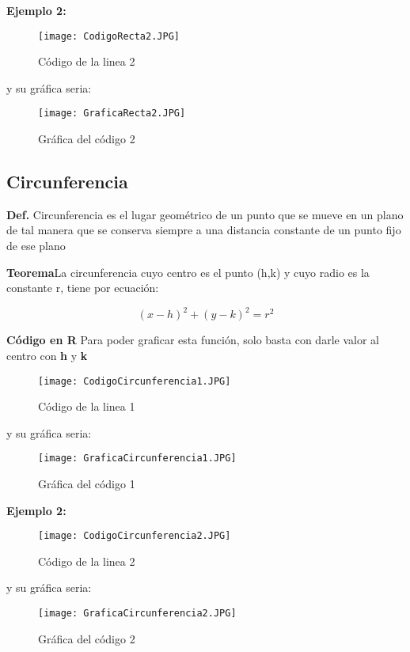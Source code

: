\documentclass{article}
\begin{document}
\textbf{Ejemplo 2:}
\newpage

\begin{figure}
\raggedright
\texttt{[image: CodigoRecta2.JPG]}
\caption{Código de la linea 2}
\label{fig:mesh3}
\end{figure}
y su gráfica seria:
\begin{figure}[h]
\centering
\texttt{[image: GraficaRecta2.JPG]}
\caption{Gráfica del código 2}
\label{fig:mesh4}
\end{figure}

\subsection{Circunferencia}
\textbf{Def.} Circunferencia es el lugar geométrico de un punto que se mueve en un plano de tal manera que se conserva siempre a una distancia constante de un punto fijo de ese plano

\textbf{Teorema}La circunferencia cuyo centro es el punto (h,k) y cuyo radio es la constante r, tiene por ecuación:

\begin{equation}
(x-h)^2 + (y-k)^2 = r^2
\end{equation}

\textbf{Código en R}
\newline Para poder graficar esta función, solo basta con darle valor al centro con \textbf{h} y \textbf{k}

\begin{figure}
\raggedright
\texttt{[image: CodigoCircunferencia1.JPG]}
\caption{Código de la linea 1}
\label{fig:mesh5}
\end{figure}
y su gráfica seria:
\begin{figure}[h]
\centering
\texttt{[image: GraficaCircunferencia1.JPG]}
\caption{Gráfica del código 1}
\label{fig:mesh6}
\end{figure}

\textbf{Ejemplo 2:}
\newpage

\begin{figure}
\raggedright
\texttt{[image: CodigoCircunferencia2.JPG]}
\caption{Código de la linea 2}
\label{fig:mesh7}
\end{figure}
y su gráfica seria:
\begin{figure}[h]
\centering
\texttt{[image: GraficaCircunferencia2.JPG]}
\caption{Gráfica del código 2}
\label{fig:mesh8}
\end{figure}
\end{document}
